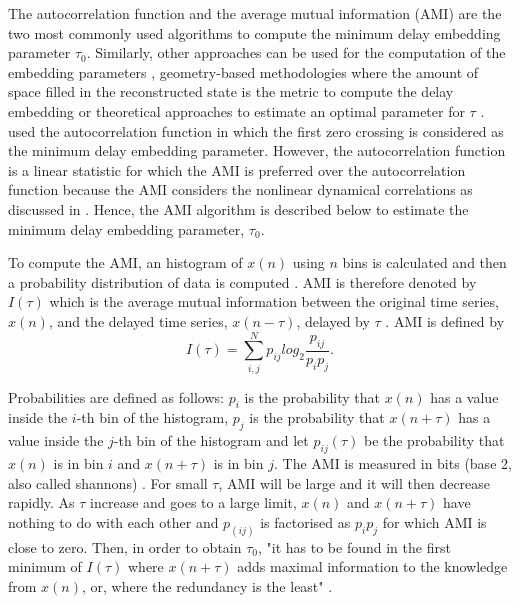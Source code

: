 The autocorrelation function and the average mutual information (AMI) are the
two most commonly used algorithms to compute the minimum delay embedding parameter
$\tau_0$. Similarly, other approaches can be used for the computation of the embedding
parameters \cite{bradley2015}, geometry-based methodologies where the amount of space
filled in the reconstructed state is the metric to compute the delay embedding
\cite{mrosenstein1994} or theoretical approaches to estimate an optimal parameter
for $\tau$ \cite{casdagli1991}. 
\cite{emrani2014a} used the autocorrelation function
in which the first zero crossing is considered as the minimum delay embedding
parameter. However, the autocorrelation function is a linear statistic for
which the AMI is preferred over the autocorrelation
function because the AMI considers the nonlinear dynamical correlations
as discussed in \cite{afraser1986,krakovska2015}.
Hence, the AMI algorithm is described below to estimate the minimum delay 
embedding parameter, \texorpdfstring{$\tau_0$}{T}.


To compute the AMI, an histogram of $x(n)$ using $n$ bins is calculated
and then a probability distribution of data is computed \cite{kantz2003}.
AMI is therefore denoted by $I(\tau)$ which is the average mutual information between
the original time series, $x(n)$, and the delayed time series, $x(n-\tau)$,
delayed by $\tau$ \cite{kabiraj2012}. AMI is defined by
\begin{equation}\label{eq:ami}
I(\tau) = \sum_{i,j}^N p_{ij} log_2 \frac{ p_{ij} }{ p_i p_j }.
\end{equation}

Probabilities are defined as follows:
$p_i$ is the probability that $x(n)$ has a value inside the $i$-th bin of the histogram,
$p_j$ is the probability that $x(n+\tau)$ has a value inside the $j$-th bin of the histogram
and let $p_{ij}(\tau)$ be the probability that $x(n)$ is in bin $i$ and $x(n+\tau)$ is in bin $j$.
The AMI is measured in bits (base 2, also called shannons) \cite{kantz2003, nonlinearTseries2016}.
For small $\tau$, AMI will be large and it will then decrease rapidly.
As $\tau$ increase and goes to a large limit, $x(n)$ and $x(n+\tau)$ have nothing
to do with each other and $p_(ij)$ is factorised as $p_ip_j$ for which AMI is close to zero.  
Then, in order to obtain $\tau_0$, "it has to be found in the first minimum of $I(\tau)$ 
where $x(n+\tau)$ adds maximal information to the knowledge from $x(n)$, or,
where the redundancy is the least" \cite{kantz2003}.

